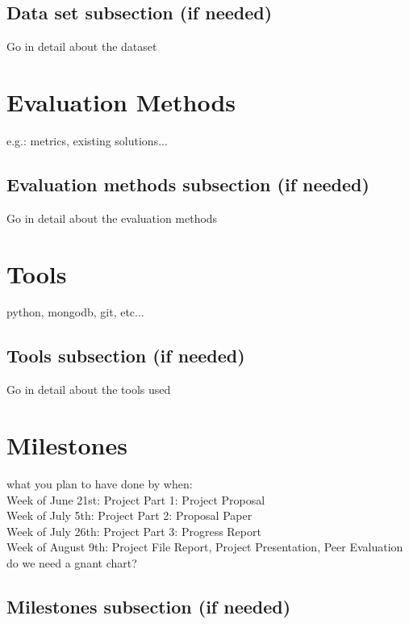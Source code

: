 \documentclass[11pt,sigconf]{acmart}
\begin{document}
\subsection{Data set subsection (if needed)}

Go in detail about the dataset



\section{Evaluation Methods}

e.g.: metrics, existing solutions...

\subsection{Evaluation methods subsection (if needed)}

Go in detail about the evaluation methods



\section{Tools}

python, mongodb, git, etc...

\subsection{Tools subsection (if needed)}

Go in detail about the tools used



\section{Milestones}

what you plan to have done by when: \\
Week of June 21st: Project Part 1: Project Proposal \\
Week of July 5th: Project Part 2: Proposal Paper \\
Week of July 26th: Project Part 3: Progress Report \\ 
Week of August 9th: Project File Report, Project Presentation, Peer Evaluation \\

do we need a gnant chart?

\subsection{Milestones subsection (if needed)}
\end{document}
